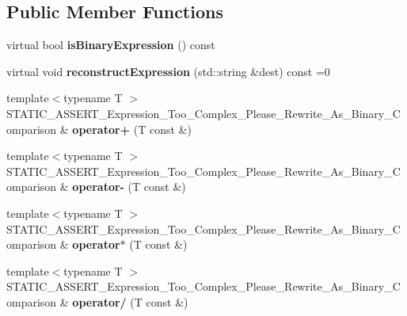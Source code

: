 \subsection*{Public Member Functions}
\begin{DoxyCompactItemize}
\item 
\mbox{\label{structCatch_1_1DecomposedExpression_a1c458ece47b71f093290dbdf9bb31fdb}} 
virtual bool {\bfseries is\+Binary\+Expression} () const
\item 
\mbox{\label{structCatch_1_1DecomposedExpression_a9ce7f356dc96f11f80e40c82f5aa7e55}} 
virtual void {\bfseries reconstruct\+Expression} (std\+::string \&dest) const =0
\item 
\mbox{\label{structCatch_1_1DecomposedExpression_aa2ce96ce31fef4afb21861bc0276edb9}} 
{\footnotesize template$<$typename T $>$ }\\S\+T\+A\+T\+I\+C\+\_\+\+A\+S\+S\+E\+R\+T\+\_\+\+Expression\+\_\+\+Too\+\_\+\+Complex\+\_\+\+Please\+\_\+\+Rewrite\+\_\+\+As\+\_\+\+Binary\+\_\+\+Comparison \& {\bfseries operator+} (T const \&)
\item 
\mbox{\label{structCatch_1_1DecomposedExpression_aff39fb5d060abbd018c83b998d32c366}} 
{\footnotesize template$<$typename T $>$ }\\S\+T\+A\+T\+I\+C\+\_\+\+A\+S\+S\+E\+R\+T\+\_\+\+Expression\+\_\+\+Too\+\_\+\+Complex\+\_\+\+Please\+\_\+\+Rewrite\+\_\+\+As\+\_\+\+Binary\+\_\+\+Comparison \& {\bfseries operator-\/} (T const \&)
\item 
\mbox{\label{structCatch_1_1DecomposedExpression_afb5527e8e3cb8edca5113ec9801249d8}} 
{\footnotesize template$<$typename T $>$ }\\S\+T\+A\+T\+I\+C\+\_\+\+A\+S\+S\+E\+R\+T\+\_\+\+Expression\+\_\+\+Too\+\_\+\+Complex\+\_\+\+Please\+\_\+\+Rewrite\+\_\+\+As\+\_\+\+Binary\+\_\+\+Comparison \& {\bfseries operator$\ast$} (T const \&)
\item 
\mbox{\label{structCatch_1_1DecomposedExpression_a519d7e2363a92106e46371c9c04044a7}} 
{\footnotesize template$<$typename T $>$ }\\S\+T\+A\+T\+I\+C\+\_\+\+A\+S\+S\+E\+R\+T\+\_\+\+Expression\+\_\+\+Too\+\_\+\+Complex\+\_\+\+Please\+\_\+\+Rewrite\+\_\+\+As\+\_\+\+Binary\+\_\+\+Comparison \& {\bfseries operator/} (T const \&)

\end{DoxyCompactItemize}
